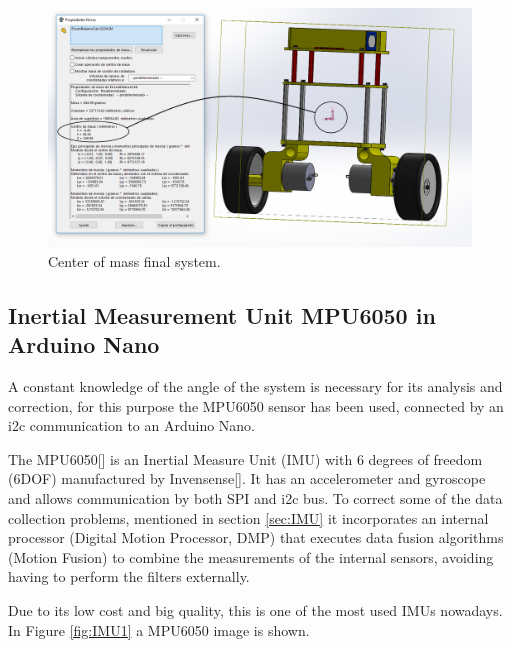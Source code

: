 \begin{figure}[H]
	\center
	\includegraphics[scale=0.3]{imagenes/Balancing_robot/center_mass}
	\caption{Center of mass final system.}
	\label{fig:center_mass}
\end{figure}

\subsection{Inertial Measurement Unit MPU6050 in Arduino Nano}\label{sec:MPU6050}

A constant knowledge of the angle of the system is necessary for its analysis and correction, for this purpose the MPU6050 sensor has been used, connected by an i2c communication to an Arduino Nano. \newline

The MPU6050[] is an Inertial Measure Unit (IMU) with 6 degrees of freedom (6DOF) manufactured by Invensense[]. It has an accelerometer and gyroscope and allows communication by both SPI and i2c bus. To correct some of the data collection problems, mentioned in section \ref{sec:IMU} it incorporates an internal processor (Digital Motion Processor, DMP) that executes data fusion algorithms (Motion Fusion) to combine the measurements of the internal sensors, avoiding having to perform the filters externally.\newline

Due to its low cost and big quality, this is one of the most used IMUs nowadays. In Figure \ref{fig:IMU1} a MPU6050 image is shown.

